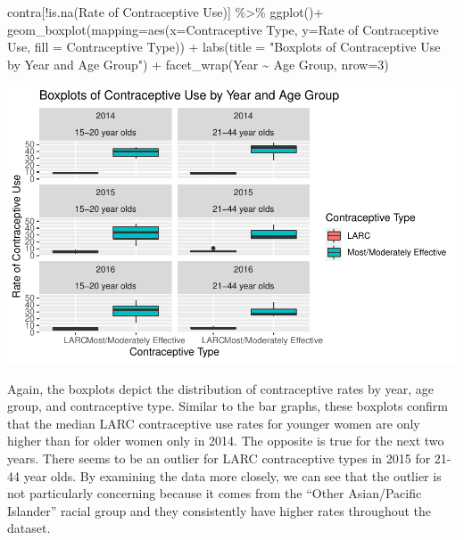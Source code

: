 \documentclass[
]{article}
\newenvironment{Shaded}{\begin{snugshade}}{\end{snugshade}}
\newcommand{\AttributeTok}[1]{\textcolor[rgb]{0.77,0.63,0.00}{#1}}
\newcommand{\DecValTok}[1]{\textcolor[rgb]{0.00,0.00,0.81}{#1}}
\newcommand{\FunctionTok}[1]{\textcolor[rgb]{0.00,0.00,0.00}{#1}}
\newcommand{\NormalTok}[1]{#1}
\newcommand{\SpecialCharTok}[1]{\textcolor[rgb]{0.00,0.00,0.00}{#1}}
\newcommand{\StringTok}[1]{\textcolor[rgb]{0.31,0.60,0.02}{#1}}
\begin{document}
\begin{Shaded}
\begin{Highlighting}[]
\NormalTok{contra[}\SpecialCharTok{!}\FunctionTok{is.na}\NormalTok{(}\StringTok{\textasciigrave{}}\AttributeTok{Rate of Contraceptive Use}\StringTok{\textasciigrave{}}\NormalTok{)] }\SpecialCharTok{\%\textgreater{}\%} 
  \FunctionTok{ggplot}\NormalTok{()}\SpecialCharTok{+}
  \FunctionTok{geom\_boxplot}\NormalTok{(}\AttributeTok{mapping=}\FunctionTok{aes}\NormalTok{(}\AttributeTok{x=}\StringTok{\textasciigrave{}}\AttributeTok{Contraceptive Type}\StringTok{\textasciigrave{}}\NormalTok{, }\AttributeTok{y=}\StringTok{\textasciigrave{}}\AttributeTok{Rate of Contraceptive Use}\StringTok{\textasciigrave{}}\NormalTok{, }\AttributeTok{fill =} \StringTok{\textasciigrave{}}\AttributeTok{Contraceptive Type}\StringTok{\textasciigrave{}}\NormalTok{)) }\SpecialCharTok{+}
   \FunctionTok{labs}\NormalTok{(}\AttributeTok{title =} \StringTok{"Boxplots of Contraceptive Use by Year and Age Group"}\NormalTok{) }\SpecialCharTok{+} 
    \FunctionTok{facet\_wrap}\NormalTok{(Year }\SpecialCharTok{\textasciitilde{}} \StringTok{\textasciigrave{}}\AttributeTok{Age Group}\StringTok{\textasciigrave{}}\NormalTok{, }\AttributeTok{nrow=}\DecValTok{3}\NormalTok{)}
\end{Highlighting}
\end{Shaded}

\begin{center}\includegraphics[width=700px]{Report_files/figure-latex/unnamed-chunk-8-1} \end{center}

Again, the boxplots depict the distribution of contraceptive rates by
year, age group, and contraceptive type. Similar to the bar graphs,
these boxplots confirm that the median LARC contraceptive use rates for
younger women are only higher than for older women only in 2014. The
opposite is true for the next two years. There seems to be an outlier
for LARC contraceptive types in 2015 for 21-44 year olds. By examining
the data more closely, we can see that the outlier is not particularly
concerning because it comes from the ``Other Asian/Pacific Islander''
racial group and they consistently have higher rates throughout the
dataset.
\end{document}
